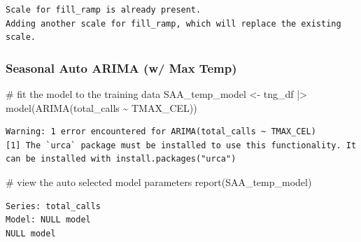 \documentclass[
  letterpaper,
  DIV=11,
  numbers=noendperiod]{scrartcl}
\newenvironment{Shaded}{\begin{snugshade}}{\end{snugshade}}
\newcommand{\CommentTok}[1]{\textcolor[rgb]{0.37,0.37,0.37}{#1}}
\newcommand{\FunctionTok}[1]{\textcolor[rgb]{0.28,0.35,0.67}{#1}}
\newcommand{\NormalTok}[1]{\textcolor[rgb]{0.00,0.23,0.31}{#1}}
\newcommand{\OtherTok}[1]{\textcolor[rgb]{0.00,0.23,0.31}{#1}}
\newcommand{\SpecialCharTok}[1]{\textcolor[rgb]{0.37,0.37,0.37}{#1}}
\begin{document}
\begin{verbatim}
Scale for fill_ramp is already present.
Adding another scale for fill_ramp, which will replace the existing scale.
\end{verbatim}

\subsubsection{Seasonal Auto ARIMA (w/ Max
Temp)}\label{seasonal-auto-arima-w-max-temp}

\begin{Shaded}
\begin{Highlighting}[]
\CommentTok{\# fit the model to the training data}
\NormalTok{SAA\_temp\_model }\OtherTok{\textless{}{-}}\NormalTok{ tng\_df }\SpecialCharTok{|\textgreater{}}
  \FunctionTok{model}\NormalTok{(}\FunctionTok{ARIMA}\NormalTok{(total\_calls }\SpecialCharTok{\textasciitilde{}}\NormalTok{ TMAX\_CEL))}
\end{Highlighting}
\end{Shaded}

\begin{verbatim}
Warning: 1 error encountered for ARIMA(total_calls ~ TMAX_CEL)
[1] The `urca` package must be installed to use this functionality. It can be installed with install.packages("urca")
\end{verbatim}

\begin{Shaded}
\begin{Highlighting}[]
\CommentTok{\# view the auto selected model parameters}
\FunctionTok{report}\NormalTok{(SAA\_temp\_model)}
\end{Highlighting}
\end{Shaded}

\begin{verbatim}
Series: total_calls 
Model: NULL model 
NULL model
\end{verbatim}
\end{document}

